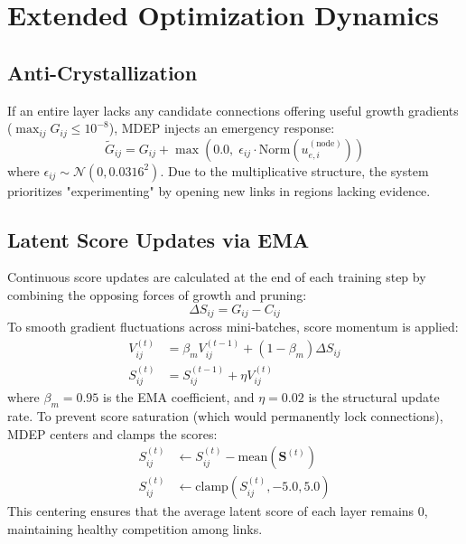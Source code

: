 \documentclass[letterpaper]{article} %
\begin{document}
\section{Extended Optimization Dynamics}
\subsection{Anti-Crystallization}\label{subsec:anti_crystal}

If an entire layer lacks any candidate connections offering useful growth gradients ($\max_{ij} G_{ij} \le 10^{-8}$), MDEP injects an emergency response:
\begin{equation}\label{eq:anti_crystal_eq}
    \tilde{G}_{ij} = G_{ij} + \max\!\left(0.0,\; \epsilon_{ij} \cdot \text{Norm}(u_{e,i}^{(\text{node})})\right)
\end{equation}
where $\epsilon_{ij} \sim \mathcal{N}(0, 0.0316^2)$. Due to the multiplicative structure, the system prioritizes "experimenting" by opening new links in regions lacking evidence.

\subsection{Latent Score Updates via EMA}\label{subsec:score_update}

Continuous score updates are calculated at the end of each training step by combining the opposing forces of growth and pruning:
\begin{equation}\label{eq:delta_S}
    \Delta S_{ij} = G_{ij} - C_{ij}
\end{equation}
To smooth gradient fluctuations across mini-batches, score momentum is applied:
\begin{align}
    V_{ij}^{(t)} &= \beta_m V_{ij}^{(t-1)} + (1 - \beta_m) \Delta S_{ij} \\
    S_{ij}^{(t)} &= S_{ij}^{(t-1)} + \eta V_{ij}^{(t)}
\end{align}
where $\beta_m = 0.95$ is the EMA coefficient, and $\eta = 0.02$ is the structural update rate. To prevent score saturation (which would permanently lock connections), MDEP centers and clamps the scores:
\begin{align}
    S_{ij}^{(t)} &\leftarrow S_{ij}^{(t)} - \text{mean}(\bm{S}^{(t)}) \\
    S_{ij}^{(t)} &\leftarrow \text{clamp}(S_{ij}^{(t)}, -5.0, 5.0)
\end{align}
This centering ensures that the average latent score of each layer remains 0, maintaining healthy competition among links.
\end{document}
